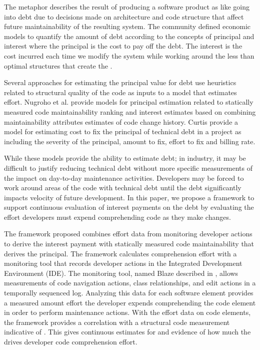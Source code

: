 The \TD metaphor describes the result of producing a software product as like going into debt due to decisions made on architecture and code structure that affect future maintainability of the resulting system\cite{cunningham1992wycash}.  The \TD community defined economic models to quantify the amount of debt according to the concepts of principal and interest where the principal is the cost to pay off the debt.  The interest is the cost incurred each time we modify the system while working around the less than optimal structures that create the \TD.  

Several approaches for estimating the principal value for debt use heuristics related to structural quality of the code as inputs to a model that estimates effort.  Nugroho et al. provide models for principal estimation related to statically measured code maintainability ranking and interest estimates based on combining maintainability attributes estimates of code change history\cite{Nugroho2011Empirical}.  Curtis \etal provide a model for estimating cost to fix the principal of technical debt in a project as including the severity of the principal, amount to fix, effort to fix and billing rate\cite{Curtis2012Estimating}.  

While these models provide the ability to estimate debt; in industry, it may be difficult to justify reducing technical debt without more specific measurements of the impact on day-to-day maintenance activities.  Developers may be forced to work around areas of the code with technical debt until the debt significantly impacts velocity of future development.  In this paper, we propose a framework to support continuous evaluation of interest payments on the debt by evaluating the effort developers must expend comprehending code as they make changes. 

The framework proposed combines effort data from monitoring developer actions to derive the interest payment with statically measured code maintainability that derives the principal.   The framework calculates comprehension effort with a monitoring tool that records developer actions in the Integrated Development Environment (IDE).  The monitoring tool, named Blaze described in \cite{Snipes2014Experiences}, allows measurements of code navigation actions, class relationships, and edit actions in a temporally sequenced log.  Analyzing this data for each software element provides a measured amount effort the developer expends comprehending the code element in order to perform maintenance actions. With the effort data on code elements, the framework provides a correlation with a structural code measurement indicative of \TD.  This gives continuous estimates for and evidence of how much the \TD drives developer code comprehension effort.